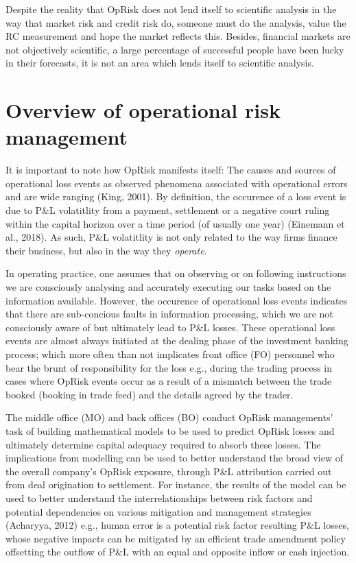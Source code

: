 \documentclass{DissertateUSU}
\begin{document}
Despite the reality that OpRisk does not lend itself to scientific
analysis in the way that market risk and credit risk do, someone must do
the analysis, value the RC measurement and hope the market reflects
this. Besides, financial markets are not objectively scientific, a large
percentage of successful people have been lucky in their forecasts, it
is not an area which lends itself to scientific analysis.

\section{Overview of operational risk management}
\label{sec:Overview of operational risk management}

It is important to note how OpRisk manifests itself: The causes and
sources of operational loss events as observed phenomena associated with
operational errors and are wide ranging (King, 2001). By definition, the
occurence of a loss event is due to P\&L volatitlity from a payment,
settlement or a negative court ruling within the capital horizon over a
time period (of usually one year) (Einemann et al., 2018). As such, P\&L
volatitlity is not only related to the way firms finance their business,
but also in the way they \emph{operate}.\medskip 

In operating practice, one assumes that on observing or on following
instructions we are consciously analysing and accurately executing our
tasks based on the information available. However, the occurence of
operational loss events indicates that there are sub-concious faults in
information processing, which we are not consciously aware of but
ultimately lead to P\&L losses. These operational loss events are almost
always initiated at the dealing phase of the investment banking process;
which more often than not implicates front office (FO) personnel who
bear the brunt of responsibility for the loss e.g., during the trading
process in cases where OpRisk events occur as a result of a mismatch
between the trade booked (booking in trade feed) and the details agreed
by the trader.\medskip

The middle office (MO) and back offices (BO) conduct OpRisk managements'
task of building mathematical models to be used to predict OpRisk losses
and ultimately determine capital adequacy required to absorb these
losses. The implications from modelling can be used to better understand
the broad view of the overall company's OpRisk exposure, through P\&L
attribution carried out from deal origination to settlement. For
instance, the results of the model can be used to better understand the
interrelationships between risk factors and potential dependencies on
various mitigation and management strategies (Acharyya, 2012) e.g.,
human error is a potential risk factor resulting P\&L losses, whose
negative impacts can be mitigated by an efficient trade amendment policy
offsetting the outflow of P\&L with an equal and opposite inflow or cash
injection.\medskip
\end{document}
